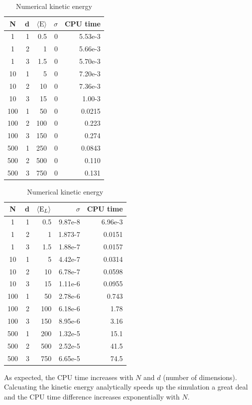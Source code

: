 \documentclass[english, a4paper]{article}
\begin{document}
\begin{table}[H]
    \begin{minipage}{.5\linewidth}
      \centering
   \begin{tabular}{ | c | r | r | r | r |}
    \hline
    N& d& $\langle \textrm{E}\rangle$& $\sigma$& CPU time \\*
    \hline
    1& 1& 0.5& 0& 5.53e-3 \\*
    \hline
    1& 2& 1& 0&  5.66e-3\\*
    \hline
    1& 3& 1.5& 0&  5.70e-3\\*
    \hline
    10& 1& 5& 0&  7.20e-3\\*
    \hline
    10& 2& 10& 0&  7.36e-3\\*
    \hline
    10& 3& 15& 0&  1.00-3\\*
    \hline
    100& 1& 50& 0&  0.0215\\*
    \hline
    100& 2& 100& 0&  0.223\\*
    \hline
    100& 3& 150& 0&  0.274\\*
    \hline
    500& 1& 250& 0&  0.0843\\*
    \hline
    500& 2& 500& 0&  0.110\\*
    \hline
    500& 3& 750& 0&  0.131\\*
    \hline
  \end{tabular}
        \caption{Analytical kinetic energy}
    \end{minipage}
    \begin{minipage}{.5\linewidth}
      \centering
       
   \begin{tabular}{ | c | r | r | r | r |}
    \hline
    N& d& $\langle {\textrm E_L} \rangle$& $\sigma$& CPU time \\*
    \hline
    1& 1& 0.5& 9.87e-8& 6.96e-3 \\*
    \hline
    1& 2& 1& 1.873-7&  0.0151\\*
    \hline
    1& 3& 1.5& 1.88e-7&  0.0157\\*
    \hline
    10& 1& 5& 4.42e-7&  0.0314\\*
    \hline
    10& 2& 10& 6.78e-7&  0.0598\\*
    \hline
    10& 3& 15& 1.11e-6&  0.0955\\*
    \hline
    100& 1& 50& 2.78e-6&  0.743\\*
    \hline
    100& 2& 100& 6.18e-6&  1.78\\*
    \hline
    100& 3& 150& 8.95e-6&  3.16\\*
    \hline
    500& 1& 200& 1.32e-5&  15.1\\*
    \hline
    500& 2& 500& 2.52e-5&  41.5\\*
    \hline
    500& 3& 750& 6.65e-5&  74.5\\*
    \hline
  \end{tabular}
   \caption{Numerical kinetic energy}
    \end{minipage} 
\end{table}
As expected, the CPU time increases with $N$ and $d$ (number of dimensions).
Calcuating the kinetic energy analytically speeds up the simulation a great deal and 
the CPU time difference increases exponentially with $N$.\\
\end{document}
